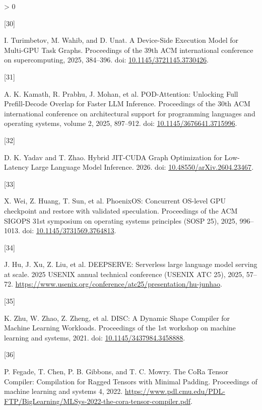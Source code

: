\documentclass[
  11pt,
  UTF8]{ctexart}
\newlength{\cslhangindent}
\newlength{\csllabelwidth}
\newenvironment{CSLReferences}[2] %
 {%
  \setlength{\parindent}{0pt}
  \ifodd #1 \everypar{\setlength{\hangindent}{\cslhangindent}}\ignorespaces\fi
  \ifnum #2 > 0
  \setlength{\parskip}{#2\baselineskip}
  \fi
 }%
 {}
\newcommand{\CSLLeftMargin}[1]{\parbox[t]{\csllabelwidth}{#1}}
\newcommand{\CSLRightInline}[1]{\parbox[t]{\linewidth - \csllabelwidth}{#1}\break}
\begin{document}
\begin{CSLReferences}{0}{0}
\leavevmode{}%
\CSLLeftMargin{{[}30{]} }
\CSLRightInline{I. Turimbetov, M. Wahib, and D. Unat. {A Device-Side
Execution Model for Multi-GPU Task Graphs}. Proceedings of the 39th ACM
international conference on supercomputing, 2025, 384--396. doi:
\href{https://doi.org/10.1145/3721145.3730426}{10.1145/3721145.3730426}.}

\leavevmode{}%
\CSLLeftMargin{{[}31{]} }
\CSLRightInline{A. K. Kamath, R. Prabhu, J. Mohan, et al.
{POD-Attention: Unlocking Full Prefill-Decode Overlap for Faster LLM
Inference}. Proceedings of the 30th ACM international conference on
architectural support for programming languages and operating systems,
volume 2, 2025, 897--912. doi:
\href{https://doi.org/10.1145/3676641.3715996}{10.1145/3676641.3715996}.}

\leavevmode{}%
\CSLLeftMargin{{[}32{]} }
\CSLRightInline{D. K. Yadav and T. Zhao. {Hybrid JIT-CUDA Graph
Optimization for Low-Latency Large Language Model Inference}. 2026. doi:
\href{https://doi.org/10.48550/arXiv.2604.23467}{10.48550/arXiv.2604.23467}.}

\leavevmode{}%
\CSLLeftMargin{{[}33{]} }
\CSLRightInline{X. Wei, Z. Huang, T. Sun, et al. PhoenixOS: Concurrent
OS-level GPU checkpoint and restore with validated speculation.
Proceedings of the ACM SIGOPS 31st symposium on operating systems
principles (SOSP 25), 2025, 996--1013. doi:
\href{https://doi.org/10.1145/3731569.3764813}{10.1145/3731569.3764813}.}

\leavevmode{}%
\CSLLeftMargin{{[}34{]} }
\CSLRightInline{J. Hu, J. Xu, Z. Liu, et al. DEEPSERVE: Serverless large
language model serving at scale. 2025 USENIX annual technical conference
(USENIX ATC 25), 2025, 57--72.
\url{https://www.usenix.org/conference/atc25/presentation/hu-junhao}.}

\leavevmode{}%
\CSLLeftMargin{{[}35{]} }
\CSLRightInline{K. Zhu, W. Zhao, Z. Zheng, et al. {DISC: A Dynamic Shape
Compiler for Machine Learning Workloads}. Proceedings of the 1st
workshop on machine learning and systems, 2021. doi:
\href{https://doi.org/10.1145/3437984.3458888}{10.1145/3437984.3458888}.}

\leavevmode{}%
\CSLLeftMargin{{[}36{]} }
\CSLRightInline{P. Fegade, T. Chen, P. B. Gibbons, and T. C. Mowry. {The
CoRa Tensor Compiler: Compilation for Ragged Tensors with Minimal
Padding}. Proceedings of machine learning and systems 4, 2022.
\url{https://www.pdl.cmu.edu/PDL-FTP/BigLearning/MLSys-2022-the-cora-tensor-compiler.pdf}.}


\end{CSLReferences}
\end{document}
